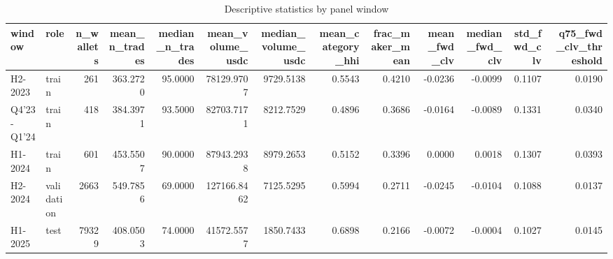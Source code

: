 \begin{table}
\caption{Descriptive statistics by panel window}
\label{tab:descriptives}
\begin{tabular}{llrrrrrrrrrrr}
\toprule
window & role & n_wallets & mean_n_trades & median_n_trades & mean_volume_usdc & median_volume_usdc & mean_category_hhi & frac_maker_mean & mean_fwd_clv & median_fwd_clv & std_fwd_clv & q75_fwd_clv_threshold \\
\midrule
H2-2023 & train & 261 & 363.2720 & 95.0000 & 78129.9707 & 9729.5138 & 0.5543 & 0.4210 & -0.0236 & -0.0099 & 0.1107 & 0.0190 \\
Q4'23-Q1'24 & train & 418 & 384.3971 & 93.5000 & 82703.7171 & 8212.7529 & 0.4896 & 0.3686 & -0.0164 & -0.0089 & 0.1331 & 0.0340 \\
H1-2024 & train & 601 & 453.5507 & 90.0000 & 87943.2938 & 8979.2653 & 0.5152 & 0.3396 & 0.0000 & 0.0018 & 0.1307 & 0.0393 \\
H2-2024 & validation & 2663 & 549.7856 & 69.0000 & 127166.8462 & 7125.5295 & 0.5994 & 0.2711 & -0.0245 & -0.0104 & 0.1088 & 0.0137 \\
H1-2025 & test & 79329 & 408.0503 & 74.0000 & 41572.5577 & 1850.7433 & 0.6898 & 0.2166 & -0.0072 & -0.0004 & 0.1027 & 0.0145 \\
\bottomrule
\end{tabular}
\end{table}

